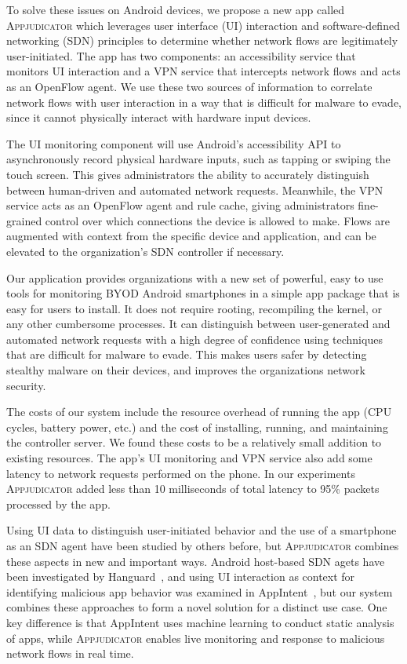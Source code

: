 To solve these issues on Android devices, we propose a new app called
\textsc{Appjudicator} which leverages user interface (UI) interaction and
software-defined networking (SDN) principles to determine whether network flows
are legitimately user-initiated. The app has two components: an accessibility
service that monitors UI interaction and a VPN service that intercepts network
flows and acts as an OpenFlow agent. We use these two sources of information to
correlate network flows with user interaction in a way that is difficult for
malware to evade, since it cannot physically interact with hardware input
devices.

The UI monitoring component will use Android's accessibility API to
asynchronously record physical hardware inputs, such as tapping or swiping the
touch screen. This gives administrators the ability to accurately distinguish
between human-driven and automated network requests.  Meanwhile, the VPN service
acts as an OpenFlow agent and rule cache, giving administrators fine-grained
control over which connections the device is allowed to make. Flows are
augmented with context from the specific device and application, and can be
elevated to the organization's SDN controller if necessary.


Our application provides organizations with a new set of powerful, easy to use
tools for monitoring BYOD Android smartphones in a simple app package that is
easy for users to install. It does not require rooting, recompiling the kernel,
or any other cumbersome processes. It can distinguish between user-generated and
automated network requests with a high degree of confidence using techniques
that are difficult for malware to evade. This makes users safer by detecting
stealthy malware on their devices, and improves the organizations network
security.

The costs of our system include the resource overhead of running the app (CPU
cycles, battery power, etc.) and the cost of installing, running, and
maintaining the controller server. We found these costs to be a relatively
small addition to existing resources. The app's UI monitoring and VPN service
also add some latency to network requests performed on the phone. In our
experiments \textsc{Appjudicator} added less than 10 milliseconds of total
latency to 95\% packets processed by the app.


Using UI data to distinguish user-initiated behavior and the use of a smartphone
as an SDN agent have been studied by others before, but \textsc{Appjudicator}
combines these aspects in new and important ways. Android host-based SDN agets
have been investigated by Hanguard~\cite{demetriou2017}, and using UI
interaction as context for identifying malicious app behavior was examined in
AppIntent~\cite{yang2013}, but our system combines these approaches to form a
novel solution for a distinct use case. One key difference is that AppIntent
uses machine learning to conduct static analysis of apps, while
\textsc{Appjudicator} enables live monitoring and response to malicious network
flows in real time.


